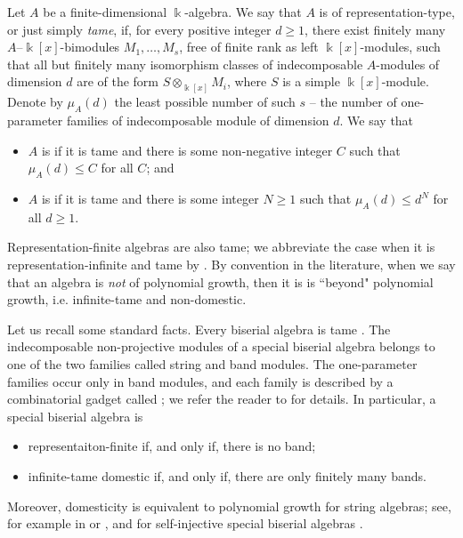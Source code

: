 \documentclass[a4paper,leqno]{amsart}
\begin{document}
\begin{dfn}
Let $A$ be a finite-dimensional $\Bbbk$-algebra.
We say that $A$ is of  representation-type, or just simply \emph{tame}, if, for every positive integer $d\geq 1$, there exist finitely many $A$--$\Bbbk[x]$-bimodules $M_1,\ldots,M_s$, free of finite rank as left $\Bbbk[x]$-modules, such that all but finitely many isomorphism classes of indecomposable $A$-modules of dimension $d$ are of the form $S\otimes_{\Bbbk[x]}M_i$, where $S$ is a simple $\Bbbk[x]$-module. Denote by $\mu_A(d)$ the least possible number of such $s$ -- the number of one-parameter families of indecomposable module of dimension $d$.
We say that
\begin{itemize}
\item $A$ is  if it is tame and there is some non-negative integer $C$ such that $\mu_A(d)\le C$ for all $C$; and

\item $A$ is  if it is tame and there is some integer $N\ge 1$ such that $\mu_A(d)\leq d^N$ for all $d\geq 1$.
\end{itemize}
\end{dfn}

\begin{rmk}
Representation-finite algebras are also tame; we abbreviate the case when it is representation-infinite and tame by .
By convention in the literature, when we say that an algebra is \emph{not} of polynomial growth, then it is is ``beyond" polynomial growth, i.e. infinite-tame and non-domestic.  
\end{rmk} 

Let us recall some standard facts. 
Every biserial algebra is tame \cite{CB95}. 
The indecomposable non-projective modules of a special biserial algebra belongs to one of the two families called string and band modules.
The one-parameter families occur only in band modules, and each family is described by a combinatorial gadget called ; we refer the reader to \cite{BR87} for details.
In particular, a special biserial algebra is 
\begin{itemize}
    \item representaiton-finite if, and only if, there is no band;
    \item infinite-tame domestic if, and only if, there are only finitely many bands.
\end{itemize}
Moreover, domesticity is equivalent to polynomial growth for string algebras; see, for example in \cite{BR87} or \cite[Corollary~B]{EKM26}, and for self-injective special biserial algebras \cite[Theorems~2.1 and~2.2]{ES92}.
\end{document}
